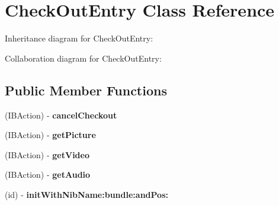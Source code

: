 \hypertarget{interface_check_out_entry}{
\section{\-Check\-Out\-Entry \-Class \-Reference}
\label{interface_check_out_entry}
}


\-Inheritance diagram for \-Check\-Out\-Entry\-:


\-Collaboration diagram for \-Check\-Out\-Entry\-:
\subsection*{\-Public \-Member \-Functions}
\begin{DoxyCompactItemize}
\item 
\hypertarget{interface_check_out_entry_a399e58272ced469a4b7a464f973b8aab}{
(\-I\-B\-Action) -\/ {\bfseries cancel\-Checkout}}
\label{interface_check_out_entry_a399e58272ced469a4b7a464f973b8aab}

\item 
\hypertarget{interface_check_out_entry_ab3a79a8ba280834e2d46777b3dffd1fa}{
(\-I\-B\-Action) -\/ {\bfseries get\-Picture}}
\label{interface_check_out_entry_ab3a79a8ba280834e2d46777b3dffd1fa}

\item 
\hypertarget{interface_check_out_entry_ac6fb809335206954226165b02fb79d3c}{
(\-I\-B\-Action) -\/ {\bfseries get\-Video}}
\label{interface_check_out_entry_ac6fb809335206954226165b02fb79d3c}

\item 
\hypertarget{interface_check_out_entry_a1c1c481a7782147983ae07dcb4691aec}{
(\-I\-B\-Action) -\/ {\bfseries get\-Audio}}
\label{interface_check_out_entry_a1c1c481a7782147983ae07dcb4691aec}

\item 
\hypertarget{interface_check_out_entry_aaad1ccbf2ae390b6e3bc09e28bcfd8d0}{
(id) -\/ {\bfseries init\-With\-Nib\-Name\-:bundle\-:and\-Pos\-:}}
\label{interface_check_out_entry_aaad1ccbf2ae390b6e3bc09e28bcfd8d0}

\end{DoxyCompactItemize}
